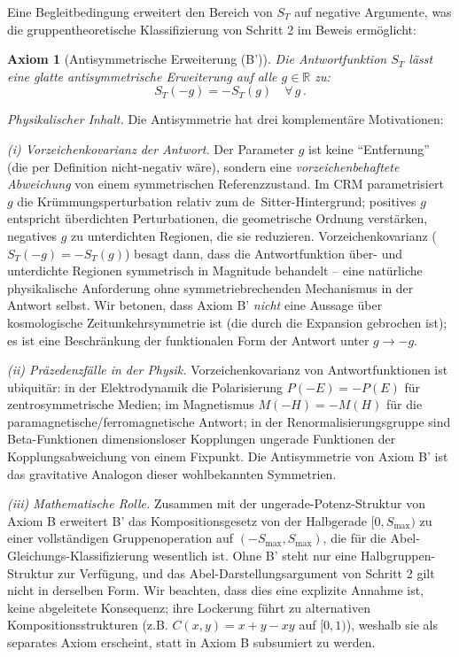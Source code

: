 \documentclass[aps,prd,twocolumn,superscriptaddress,nofootinbib]{revtex4-2}
\newtheorem{axiom}{Axiom}
\begin{document}
Eine Begleitbedingung erweitert den Bereich von $S_T$ auf negative Argumente, was die gruppentheoretische Klassifizierung von Schritt 2 im Beweis ermöglicht:

\begin{axiom}[Antisymmetrische Erweiterung (B')]
\label{ax:antisymmetry}
Die Antwortfunktion $S_T$ lässt eine glatte antisymmetrische Erweiterung auf alle $g \in \mathbb{R}$ zu:
\begin{equation}
S_T(-g) = -S_T(g) \quad \forall\, g\,.
\label{eq:antisymmetry}
\end{equation}
\end{axiom}

\textit{Physikalischer Inhalt.} Die Antisymmetrie hat drei komplementäre Motivationen:

\textit{(i) Vorzeichenkovarianz der Antwort.} Der Parameter $g$ ist keine ``Entfernung'' (die per Definition nicht-negativ wäre), sondern eine \textit{vorzeichenbehaftete Abweichung} von einem symmetrischen Referenzzustand. Im CRM parametrisiert $g$ die Krümmungsperturbation relativ zum de~Sitter-Hintergrund; positives $g$ entspricht überdichten Perturbationen, die geometrische Ordnung verstärken, negatives $g$ zu unterdichten Regionen, die sie reduzieren. Vorzeichenkovarianz ($S_T(-g) = -S_T(g)$) besagt dann, dass die Antwortfunktion über- und unterdichte Regionen symmetrisch in Magnitude behandelt -- eine natürliche physikalische Anforderung ohne symmetriebrechenden Mechanismus in der Antwort selbst. Wir betonen, dass Axiom B' \textit{nicht} eine Aussage über kosmologische Zeitumkehrsymmetrie ist (die durch die Expansion gebrochen ist); es ist eine Beschränkung der funktionalen Form der Antwort unter $g \to -g$.

\textit{(ii) Präzedenzfälle in der Physik.} Vorzeichenkovarianz von Antwortfunktionen ist ubiquitär: in der Elektrodynamik die Polarisierung $P(-E) = -P(E)$ für zentrosymmetrische Medien; im Magnetismus $M(-H) = -M(H)$ für die paramagnetische/ferromagnetische Antwort; in der Renormalisierungsgruppe sind Beta-Funktionen dimensionsloser Kopplungen ungerade Funktionen der Kopplungsabweichung von einem Fixpunkt. Die Antisymmetrie von Axiom B' ist das gravitative Analogon dieser wohlbekannten Symmetrien.

\textit{(iii) Mathematische Rolle.} Zusammen mit der ungerade-Potenz-Struktur von Axiom B erweitert B' das Kompositionsgesetz von der Halbgerade $[0, S_{\max})$ zu einer vollständigen Gruppenoperation auf $(-S_{\max}, S_{\max})$, die für die Abel-Gleichungs-Klassifizierung wesentlich ist. Ohne B' steht nur eine Halbgruppen-Struktur zur Verfügung, und das Abel-Darstellungsargument von Schritt 2 gilt nicht in derselben Form. Wir beachten, dass dies eine explizite Annahme ist, keine abgeleitete Konsequenz; ihre Lockerung führt zu alternativen Kompositionsstrukturen (z.B. $C(x,y) = x + y - xy$ auf $[0,1)$), weshalb sie als separates Axiom erscheint, statt in Axiom B subsumiert zu werden.
\end{document}
